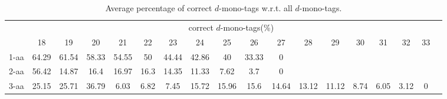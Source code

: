 \begin{table}[h]\tiny
\vspace{3mm}
{\centering
\begin{center}
\begin{tabular}{|l|c|c|c|c|c|c|c|c|c|c|c|c|c|c|c|c|c|}
  \hline
  & \multicolumn{ 16 }{|c|}{correct $d$-mono-tags(\%)} \\
  \cline{2- 17}
    & 18 & 19 & 20 & 21 & 22 & 23 & 24 & 25 & 26 & 27 & 28 & 29 & 30 & 31 & 32 & 33\\
  \hline
1-aa  & 64.29 & 61.54 & 58.33 & 54.55 & 50 & 44.44 & 42.86 & 40 & 33.33 & 0 &  &  &  &  &  & \\
2-aa  & 56.42 & 14.87 & 16.4 & 16.97 & 16.3 & 14.35 & 11.33 & 7.62 & 3.7 & 0 &  &  &  &  &  & \\
3-aa  & 25.15 & 25.71 & 36.79 & 6.03 & 6.82 & 7.45 & 15.72 & 15.96 & 15.6 & 14.64 & 13.12 & 11.12 & 8.74 & 6.05 & 3.12 & 0\\
 \hline
\end{tabular}
\end{center}
\par}
\centering

\caption{ Average percentage of correct $d$-mono-tags w.r.t. all $d$-mono-tags.}

\vspace{3mm}
\label{table:correct-d-mono-tags}
\end{table}
